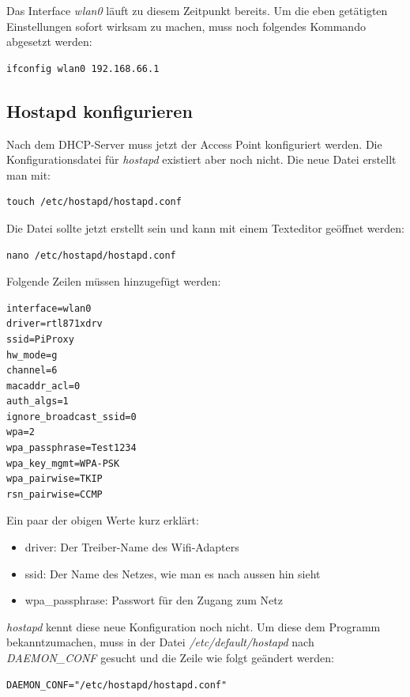Das Interface \textit{wlan0} läuft zu diesem Zeitpunkt bereits. Um die eben getätigten Einstellungen sofort wirksam zu machen, muss noch folgendes Kommando abgesetzt werden:

\begin{lstlisting}
ifconfig wlan0 192.168.66.1
\end{lstlisting}

\subsection{Hostapd konfigurieren}
Nach dem DHCP-Server muss jetzt der Access Point konfiguriert werden. Die Konfigurationsdatei für \textit{hostapd} existiert aber noch nicht. Die neue Datei erstellt man mit:

\begin{lstlisting}
touch /etc/hostapd/hostapd.conf
\end{lstlisting}

Die Datei sollte jetzt erstellt sein und kann mit einem Texteditor geöffnet werden:

\begin{lstlisting}
nano /etc/hostapd/hostapd.conf
\end{lstlisting}

Folgende Zeilen müssen hinzugefügt werden:

\begin{lstlisting}
interface=wlan0
driver=rtl871xdrv
ssid=PiProxy
hw_mode=g
channel=6
macaddr_acl=0
auth_algs=1
ignore_broadcast_ssid=0
wpa=2
wpa_passphrase=Test1234
wpa_key_mgmt=WPA-PSK
wpa_pairwise=TKIP
rsn_pairwise=CCMP
\end{lstlisting}

Ein paar der obigen Werte kurz erklärt: 
\begin{itemize}
\item driver: Der Treiber-Name des Wifi-Adapters
\item ssid: Der Name des Netzes, wie man es nach aussen hin sieht
\item wpa\_passphrase: Passwort für den Zugang zum Netz
\end{itemize}

\textit{hostapd} kennt diese neue Konfiguration noch nicht. Um diese dem Programm bekanntzumachen, muss in der Datei \textit{/etc/default/hostapd} nach \textit{DAEMON\_CONF} gesucht und die Zeile wie folgt geändert werden:

\begin{lstlisting}
DAEMON_CONF="/etc/hostapd/hostapd.conf"
\end{lstlisting}

